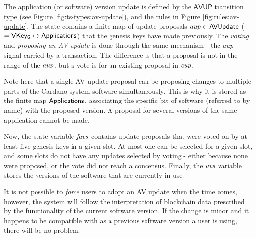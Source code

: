 The application (or software) version update is defined by the $\mathsf{AVUP}$
transition type (see Figure \ref{fig:ts-types:av-update}), and the rules in
Figure \ref{fig:rules:av-update}.
The state contains a finite map of update proposals
$\mathit{aup} \in \mathsf{AVUpdate}$ ($= \mathsf{VKey_G} \mapsto \mathsf{Applications}$) that the genesis keys have
made previously.
The \textit{voting} and \textit{proposing an AV update} is done through the same
mechanism - the $\mathit{aup}$ signal carried by a transaction. The difference
is that a proposal is not in the
range of the $\mathit{aup}$, but a vote is for an existing proposal 
in $\mathit{aup}$.

Note here that a single AV update proposal can be
proposing changes to multiple parts of the Cardano system software simultaneously.
This is why it is stored as the finite map $\mathsf{Applications}$, associating the
specific bit of software (referred to by name) with the proposed version.
A proposal for several versions of the same application cannot be made.

Now, the state variable $\mathit{favs}$ contains update proposals that
were voted on by at least five genesis keys in a given slot.
At most one
can be selected for a given slot, and some slots do not have any
updates selected by voting - either because none were proposed, or the vote
did not reach a concensus. Finally, the $\mathit{avs}$ variable stores
the versions of the software that are currently in use.

It is not possible to
\textit{force} users to adopt an AV update when the time comes, however,
the system will follow the interpretation of blockchain data prescribed by
the functionality of the current software version. If the change is minor and
it happens to be
compatible with as a previous software version a user is using, there
will be no problem.

